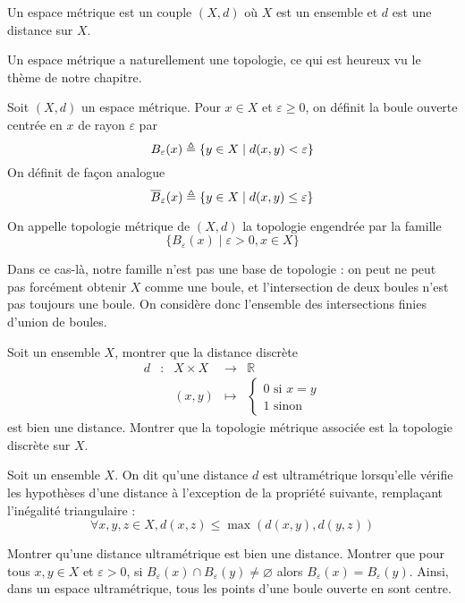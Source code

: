 \begin{definition}
  Un espace métrique est un couple $(X,d)$ où $X$ est un ensemble et $d$ est une
  distance sur $X$.
\end{definition}

Un espace métrique a naturellement une topologie, ce qui est heureux vu le
thème de notre chapitre.

\begin{definition}
  Soit $(X,d)$ un espace métrique. Pour $x\in X$ et $\varepsilon \geq 0$, on
  définit la boule ouverte centrée en $x$ de rayon $\varepsilon$ par
  \[B_\varepsilon(x) \triangleq \{y\in X \mid d(x,y) < \varepsilon\}\]
  On définit de façon analogue
  \[\overline{B}_\varepsilon(x)\triangleq\{y\in X \mid d(x,y)\leq\varepsilon\}\]

  On appelle topologie métrique de $(X,d)$ la topologie engendrée par la
  famille
  \[\{B_\varepsilon(x) \mid \varepsilon > 0, x \in X \}\]
\end{definition}

\begin{remark}
  Dans ce cas-là, notre famille n'est pas une base de topologie : on peut ne
  peut pas forcément obtenir $X$ comme une boule, et l'intersection de deux
  boules n'est pas toujours une boule. On considère donc l'ensemble des
  intersections finies d'union de boules.
\end{remark}

\begin{exercise}
  Soit un ensemble $X$, montrer que la distance discrète
  \[\begin{array}{ccccc}
  d & : & X \times X & \longrightarrow & \mathbb R\\
  & & (x,y) & \longmapsto &
  \begin{cases}
    0\text{ si } x = y\\
    1\text{ sinon}
  \end{cases}
  \end{array}\]
  est bien une distance. Montrer que la topologie métrique associée est la
  topologie discrète sur $X$.
\end{exercise}

\begin{exercise}
  Soit un ensemble $X$. On dit qu'une distance $d$ est ultramétrique lorsqu'elle
  vérifie les hypothèses d'une distance à l'exception de la propriété suivante,
  remplaçant l'inégalité triangulaire :
  \[\forall x,y,z\in X, d(x,z)\leq \max(d(x,y),d(y,z))\]

  Montrer qu'une distance ultramétrique est bien une distance. Montrer que pour
  tous $x,y\in X$ et $\varepsilon > 0$, si
  $B_\varepsilon(x)\cap B_\varepsilon(y)\neq\varnothing$ alors
  $B_\varepsilon(x) = B_\varepsilon(y)$. Ainsi, dans un espace ultramétrique, tous
  les points d'une boule ouverte en sont centre.
\end{exercise}

